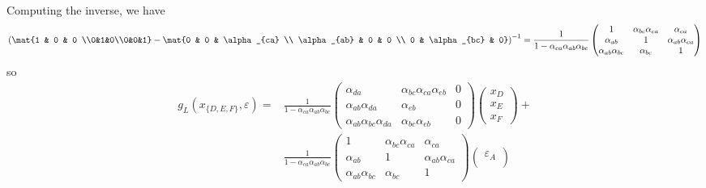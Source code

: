 \begin{enumerate}
\begin{gradedsolution}
\begin{enumerate}
\begin{align*}
			\end{align*}
			Computing the inverse, we have
			\begin{equation*}
				\left(\mat{1 & 0           & 0              \\0&1&0\\0&0&1} - \mat{0 & 0 & \alpha_{ca}  \\
					\alpha_{ab}                                      & 0           & 0              \\
					0                                                & \alpha_{bc} & 0}\right)^{-1} = \frac{1}{1-\alpha_{ca}\alpha_{ab}\alpha_{bc}}\begin{pmatrix}
					1                      & \alpha_{bc}\alpha_{ca} & \alpha_{ca}            \\
					\alpha_{ab}            & 1                      & \alpha_{ab}\alpha_{ca} \\
					\alpha_{ab}\alpha_{bc} & \alpha_{bc}            & 1
				\end{pmatrix}
			\end{equation*}
			so
			\begin{align*}
				g_L(x_{\{D, E, F\}}, \varepsilon) = & \frac{1}{1-\alpha_{ca}\alpha_{ab}\alpha_{bc}}
				\begin{pmatrix}
					\alpha_{da}                       & \alpha_{bc}\alpha_{ca}\alpha_{eb} & 0 \\
					\alpha_{ab}\alpha_{da}            & \alpha_{eb}                       & 0 \\
					\alpha_{ab}\alpha_{bc}\alpha_{da} & \alpha_{bc}\alpha_{eb}            & 0
				\end{pmatrix}
				\begin{pmatrix}x_D \\ x_E\\ x_F \end{pmatrix}+                                      \\
				                                    & \frac{1}{1-\alpha_{ca}\alpha_{ab}\alpha_{bc}}
				\begin{pmatrix}
					1                      & \alpha_{bc}\alpha_{ca} & \alpha_{ca}            \\
					\alpha_{ab}            & 1                      & \alpha_{ab}\alpha_{ca} \\
					\alpha_{ab}\alpha_{bc} & \alpha_{bc}            & 1
				\end{pmatrix}
				\begin{pmatrix}
					\varepsilon_A \\

\end{pmatrix}
\end{align*}
\end{enumerate}
\end{gradedsolution}
\end{enumerate}
